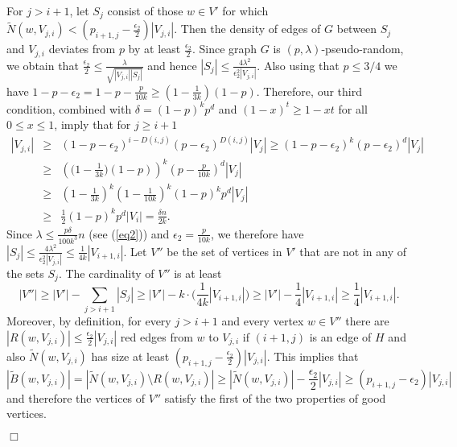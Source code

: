 \documentclass[11pt]{article}
\newenvironment{proof}
      {\medskip\noindent{\bf Proof.}\hspace{1mm}}
      {\hfill$\Box$\medskip}
\begin{document}
\begin{proof}
For $j >i+1$, let $S_j$ consist of those $w \in V'$
for which $\tilde{N}(w,V_{j,i}) < (p_{i+1,j}-\frac{\epsilon_2}{2})|V_{j,i}|$.
Then the density of edges of $G$ between
$S_j$ and $V_{j,i}$ deviates from $p$ by at least $\frac{\epsilon_2}{2}$.  Since
graph $G$ is $(p,\lambda)$-pseudo-random, we obtain that $\frac{\epsilon_2}{2} \leq
\frac{\lambda}{\sqrt{|V_{j,i}||S_j|}}$ and hence $|S_j| \leq \frac{4\lambda^2}{\epsilon_2^2|V_{j,i}|}$.
 Also using that $p \leq 3/4$ we have
$1-p-\epsilon_2=1-p-\frac{p}{10k} \geq (1-\frac{1}{3k})(1-p)$.
Therefore, our third condition, combined with $\delta=(1-p)^kp^d$ and $(1-x)^t \geq 1-xt$ for all $0 \leq x \leq 1$,
imply that for $j \geq i+1$
\begin{eqnarray}
\label{eq1}
|V_{j,i}| &\geq& (1-p-\epsilon_2)^{i-D(i,j)}(p-\epsilon_2)^{D(i,j)}|V_j| \geq
(1-p-\epsilon_2)^k(p-\epsilon_2)^d|V_j| \nonumber\\
 &\geq& \left(\Big(1-\frac{1}{3k}\Big)(1-p)\right)^k
\left(p-\frac{p}{10k}\right)^d|V_j| \nonumber \\
&\geq& \left(1-\frac{1}{3k}\right)^k\left(1-\frac{1}{10k}\right)^k(1-p)^kp^d|V_j| \nonumber\\
 &\geq&
\frac{1}{2}(1-p)^kp^d|V_i|= \frac{\delta n}{2k}.
\end{eqnarray}
Since $\lambda \leq \frac{p\delta}{100k^3}n$ (see (\ref{eq2}))
and $\epsilon_2=\frac{p}{10k}$, we therefore have $|S_j| \leq
\frac{4\lambda^2}{\epsilon_2^2|V_{j,i}|} \leq
\frac{1}{4k}|V_{i+1,i}|$. Let $V''$ be the set of vertices in $V'$
that are not in any of the sets $S_j$. The cardinality of $V''$ is at least
$$|V''|\geq |V'|-\sum_{j>i+1}|S_j| \geq |V'|-k\cdot\Big(\frac{1}{4k}|V_{i+1,i}|\Big) \geq
|V'|-\frac{1}{4}|V_{i+1,i}| \geq \frac{1}{4}|V_{i+1,i}|.$$
Moreover, by definition, for every $j>i+1$ and every vertex
$w \in V''$ there are  $|R(w,V_{j,i})| \leq \frac{\epsilon_2}{2}|V_{j,i}|$ red edges from
$w$ to $V_{j,i}$ if $(i+1,j)$ is an edge of $H$ and also $\tilde{N}(w,V_{j,i})$ has size at least $(p_{i+1,j}-\frac{\epsilon_2}{2})|V_{j,i}|$.
This implies that
$$|\tilde{B}(w,V_{j,i})|= |\tilde{N}(w,V_{j,i}) \setminus R(w,V_{j,i})| \geq |\tilde{N}(w,V_{j,i})|-\frac{\epsilon_2}{2}|V_{j,i}| \geq
(p_{i+1,j}-\epsilon_2)|V_{j,i}|$$
and therefore the vertices of $V''$ satisfy the first
of the two properties of good vertices.


\end{proof}
\end{document}
